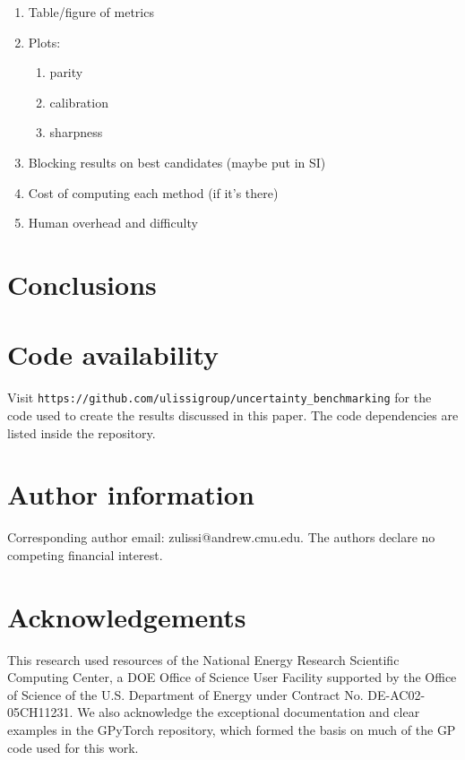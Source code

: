 \documentclass[]{achemso}
\begin{document}
\begin{enumerate}
    \item{Table/figure of metrics}
    \item{Plots:}
        \begin{enumerate}
            \item{parity}
            \item{calibration}
            \item{sharpness}
        \end{enumerate}
    \item{Blocking results on best candidates (maybe put in SI)}
    \item{Cost of computing each method (if it’s there)}
    \item{Human overhead and difficulty}
\end{enumerate}



\section{Conclusions}




\section*{Code availability} Visit \texttt{https://github.com/ulissigroup/uncertainty\_benchmarking} for the code used to create the results discussed in this paper.
The code dependencies are listed inside the repository.

\section*{Author information} Corresponding author email:  zulissi@andrew.cmu.edu.
The authors declare no competing financial interest.

\section*{Acknowledgements} This research used resources of the National Energy Research Scientific Computing Center, a DOE Office of Science User Facility supported by the Office of Science of the U.S. Department of Energy under Contract No. DE-AC02-05CH11231. %
We also acknowledge the exceptional documentation and clear examples in the GPyTorch\cite{Gardner2018} repository, which formed the basis on much of the \gls{GP} code used for this work.



\clearpage

\end{document}
